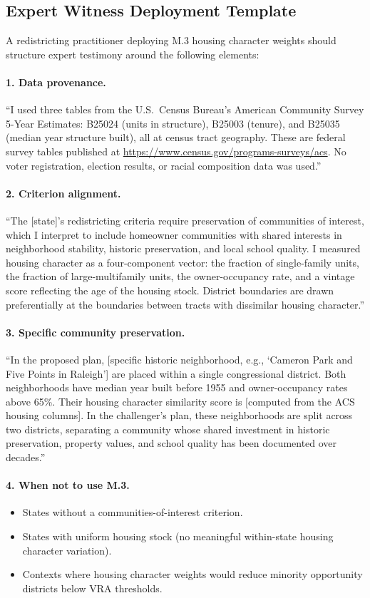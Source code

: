 \subsection{Expert Witness Deployment Template}

A redistricting practitioner deploying M.3 housing character weights should
structure expert testimony around the following elements:

\paragraph{1. Data provenance.}
``I used three tables from the U.S.\ Census Bureau's American Community Survey
5-Year Estimates: B25024 (units in structure), B25003 (tenure), and B25035
(median year structure built), all at census tract geography.
These are federal survey tables published at
\url{https://www.census.gov/programs-surveys/acs}.
No voter registration, election results, or racial composition data was used.''

\paragraph{2. Criterion alignment.}
``The [state]'s redistricting criteria require preservation of communities of
interest, which I interpret to include homeowner communities with shared
interests in neighborhood stability, historic preservation, and local school
quality.
I measured housing character as a four-component vector: the fraction of
single-family units, the fraction of large-multifamily units, the
owner-occupancy rate, and a vintage score reflecting the age of the housing stock.
District boundaries are drawn preferentially at the boundaries between tracts
with dissimilar housing character.''

\paragraph{3. Specific community preservation.}
``In the proposed plan, [specific historic neighborhood, e.g., `Cameron Park and
Five Points in Raleigh'] are placed within a single congressional district.
Both neighborhoods have median year built before 1955 and owner-occupancy rates
above 65\%.
Their housing character similarity score is [computed from the ACS housing
columns].
In the challenger's plan, these neighborhoods are split across two districts,
separating a community whose shared investment in historic preservation,
property values, and school quality has been documented over decades.''

\paragraph{4. When not to use M.3.}
\begin{itemize}
  \item States without a communities-of-interest criterion.
  \item States with uniform housing stock (no meaningful within-state housing
    character variation).
  \item Contexts where housing character weights would reduce minority
    opportunity districts below VRA thresholds.
\end{itemize}
